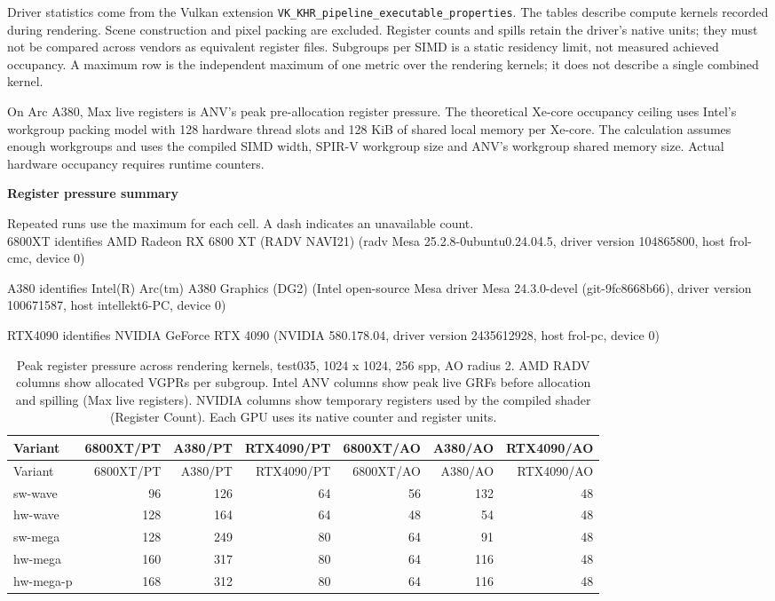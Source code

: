 \begingroup\scriptsize
Driver statistics come from the Vulkan extension \texttt{VK\_KHR\_pipeline\_executable\_properties}. The tables describe compute kernels recorded during rendering. Scene construction and pixel packing are excluded. Register counts and spills retain the driver's native units; they must not be compared across vendors as equivalent register files. Subgroups per SIMD is a static residency limit, not measured achieved occupancy. A maximum row is the independent maximum of one metric over the rendering kernels; it does not describe a single combined kernel.\par
On Arc A380, Max live registers is ANV's peak pre-allocation register pressure. The theoretical Xe-core occupancy ceiling uses Intel's workgroup packing model with 128 hardware thread slots and 128 KiB of shared local memory per Xe-core. The calculation assumes enough workgroups and uses the compiled SIMD width, SPIR-V workgroup size and ANV's workgroup shared memory size. Actual hardware occupancy requires runtime counters.\par\medskip
\noindent\textbf{Register pressure summary}\par
Repeated runs use the maximum for each cell. A dash indicates an unavailable count.\\
\noindent 6800XT identifies AMD Radeon RX 6800 XT (RADV NAVI21) (radv Mesa 25.2.8-0ubuntu0.24.04.5, driver version 104865800, host frol-cmc, device 0)\par
\noindent A380 identifies Intel(R) Arc(tm) A380 Graphics (DG2) (Intel open-source Mesa driver Mesa 24.3.0-devel (git-9fc8668b66), driver version 100671587, host intellekt6-PC, device 0)\par
\noindent RTX4090 identifies NVIDIA GeForce RTX 4090 (NVIDIA 580.178.04, driver version 2435612928, host frol-pc, device 0)\par
\begin{longtable}{lrrrrrr}
\caption{Peak register pressure across rendering kernels, test035, 1024 x 1024, 256 spp, AO radius 2. AMD RADV columns show allocated VGPRs per subgroup. Intel ANV columns show peak live GRFs before allocation and spilling (Max live registers). NVIDIA columns show temporary registers used by the compiled shader (Register Count). Each GPU uses its native counter and register units.}\label{tab:hydra-summary-0-maximum}\\
\hline Variant & 6800XT/PT & A380/PT & RTX4090/PT & 6800XT/AO & A380/AO & RTX4090/AO \\\hline
\endfirsthead
\hline Variant & 6800XT/PT & A380/PT & RTX4090/PT & 6800XT/AO & A380/AO & RTX4090/AO \\\hline
\endhead
sw-wave & 96 & 126 & 64 & 56 & 132 & 48 \\
hw-wave & 128 & 164 & 64 & 48 & 54 & 48 \\
sw-mega & 128 & 249 & 80 & 64 & 91 & 48 \\
hw-mega & 160 & 317 & 80 & 64 & 116 & 48 \\
hw-mega-p & 168 & 312 & 80 & 64 & 116 & 48 \\
\hline
\end{longtable}
